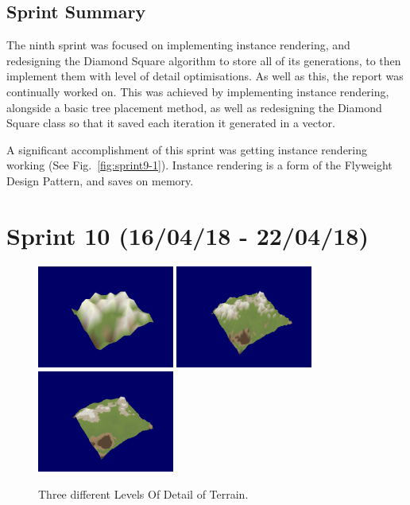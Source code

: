 \documentclass[a4paper,10pt]{report}
\begin{document}
\subsection{Sprint Summary}

The ninth sprint was focused on implementing instance rendering, and redesigning the Diamond Square algorithm to store all of its generations, to then implement them with level of detail optimisations. As well as this, the report was continually worked on. This was achieved by implementing instance rendering, alongside a basic tree placement method, as well as redesigning the Diamond Square class so that it saved each iteration it generated in a vector. \medskip

A significant accomplishment of this sprint was getting instance rendering working (See Fig.~\ref{fig:sprint9-1}). Instance rendering is a form of the Flyweight Design Pattern, and saves on memory.

\clearpage
\section{Sprint 10 (16/04/18 -  22/04/18)}

\begin{figure}[h!]
\centering
  \includegraphics[width=0.4\textwidth]{Images/Sprint-Images/Sprint10-1.png} \medskip
  \includegraphics[width=0.4\textwidth]{Images/Sprint-Images/Sprint10-2.png} \medskip
  \includegraphics[width=0.4\textwidth]{Images/Sprint-Images/Sprint10-3.png} \medskip
\caption{Three different Levels Of Detail of Terrain.}
\label{loddiamondsq}
\end{figure}
\end{document}
